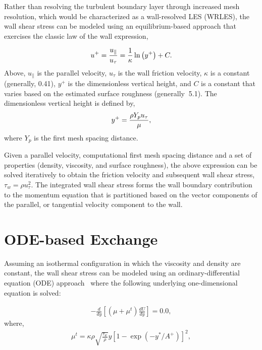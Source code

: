 \documentclass{article}
\begin{document}
Rather than resolving the turbulent boundary layer through increased mesh resolution, which 
would be characterized as a wall-resolved LES (WRLES), the wall shear stress can be 
modeled using an equilibrium-based approach that exercises the classic law of the wall
expression,

\begin{align}
u^+ = {u_{\|} \over u_{\tau}} 
    = { 1 \over \kappa } \ln \left(y^+\right) + C.
\label{law_wall}
\end{align}
Above, $u_{\|}$ is the parallel velocity, $u_\tau$ is the wall friction velocity, $\kappa$ is a constant
(generally, 0.41), $y^+$ is the dimensionless vertical height, and $C$ is a constant that varies
based on the estimated surface roughness (generally $~$5.1). The dimensionless vertical height is defined
by,
%
\begin{align} 
        y^+ =  {{ \rho Y_p u_{\tau}} \over {\mu }},
\label{yplus}
\end{align}
where $Y_p$ is the first mesh spacing distance.

Given a parallel velocity, computational first mesh spacing distance and a set of properties (density, 
viscosity, and surface roughness), the above expression can be solved iteratively to obtain the friction 
velocity and subsequent wall shear stress, $\tau_w = \rho u^2_\tau$. The integrated wall shear stress forms
the wall boundary contribution to the momentum equation that is partitioned based on the vector components 
of the parallel, or tangential velocity component to the wall.

\section{ODE-based Exchange}
Assuming an isothermal configuration in which the viscosity and density are constant, the wall shear stress 
can be modeled using an ordinary-differential equation (ODE) approach~\cite{larsson2016} where the 
following underlying one-dimensional equation is solved:

\begin{align} 
       -\frac{d}{dy}\left[ \left(\mu + \mu^t\right) \frac{dU}{dy}  \right] = 0.0,
\label{odeExpression}
\end{align}
where,
%
\begin{align} 
       \mu^t = \kappa \rho \sqrt{\frac{\tau_w}{\rho}} y \left[1 - \exp\left(-y^*/A^+\right)\right]^2,
\label{odeExpressionMuT}
\end{align}
\end{document}
